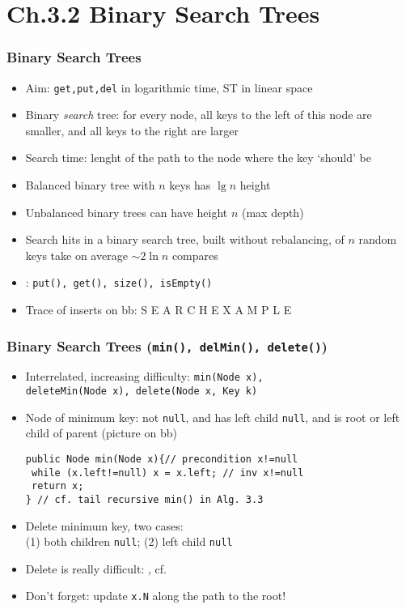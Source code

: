 \documentclass[handout]{beamer}
\newcommand{\git}{https://github.com/marcbezem/INF102/blob/master}
\begin{document}
\section{Ch.3.2 Binary Search Trees}

\begin{frame}
    \frametitle{Binary Search Trees}

\begin{itemize}[<+->]
\item Aim: {\tt get,put,del} in logarithmic time, ST in linear space
\item Binary \emph{search} tree: for every node, all keys to the left of this node
are smaller, and all keys to the right are larger
\item Search time: lenght of the path to the node where the key `should' be
\item Balanced binary tree with $n$ keys has $\lg n$ height
\item Unbalanced binary trees can have height $n$ (max depth)
\item Search hits in a binary search tree, built without rebalancing, 
of $n$ random keys take on average $\sim 2\ln n$ compares
\item \href{\git/programs/searching/elementarySymbolTables/UBST.java}%
{\color{red}{UBST.java}}: {\tt put(), get(), size(), isEmpty()}
\item Trace of inserts on bb: S E A R C H E X A M P L E
\end{itemize}     
\end{frame}

\begin{frame}[fragile]
    \frametitle{Binary Search Trees ({\tt min(), delMin(), delete()})}

\begin{itemize}[<+->]
\item Interrelated, increasing difficulty: {\tt min(Node x),\\
deleteMin(Node x), delete(Node x, Key k)}
\item Node of minimum key: not {\tt null}, and has left child {\tt null}, and is root or 
left child of parent (picture on bb)
\begin{verbatim}
public Node min(Node x){// precondition x!=null
 while (x.left!=null) x = x.left; // inv x!=null
 return x; 
} // cf. tail recursive min() in Alg. 3.3
\end{verbatim}
\item Delete minimum key, two cases:\\ (1) both children {\tt null}; (2) left child {\tt null} 
\item Delete is really difficult: \href{http://algs4.cs.princeton.edu/code/edu/princeton/cs/algs4/BST.java.html}%
{\color{red}{BST.java}},
cf.\ \href{\git/programs/searching/elementarySymbolTables/ArrayListST.java}%
{\color{red}{ArrayListST.java}}
\item Don't forget: update {\tt x.N} along the path to the root!
\end{itemize}     
\end{frame}
\end{document}
